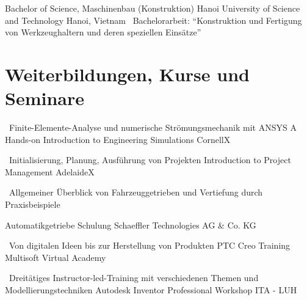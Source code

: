 \documentclass[11pt,a4paper,sans]{moderncv}
\begin{document}
{Bachelor of Science, Maschinenbau (Konstruktion)}
{Hanoi University of Science and Technology}
{Hanoi, Vietnam}
{}
{
    \ Bachelorarbeit: ``Konstruktion und Fertigung von Werkzeughaltern und deren speziellen Einsätze''
}


\section{\textbf{Weiterbildungen, Kurse und Seminare}}

{\ Finite-Elemente-Analyse und numerische Strömungsmechanik mit ANSYS}
{A Hands-on Introduction to Engineering Simulations}
{CornellX}
{}
{}


{\ Initialisierung, Planung, Ausführung von Projekten}
{Introduction to Project Management}
{AdelaideX}
{}
{}


{
\parbox[t]{10cm}{\ Allgemeiner Überblick von Fahrzeuggetrieben und Vertiefung durch Praxisbeispiele}
}
{Automatikgetriebe Schulung}
{Schaeffler Technologies AG \& Co. KG}
{}
{}


{\ Von digitalen Ideen bis zur Herstellung von Produkten}
{PTC Creo Training}
{Multisoft Virtual Academy}
{}
{}



{\ Dreitätiges Instructor-led-Training mit verschiedenen Themen und Modellierungstechniken}
{Autodesk Inventor Professional Workshop}
{ITA - LUH}
{}
{}



\end{document}

